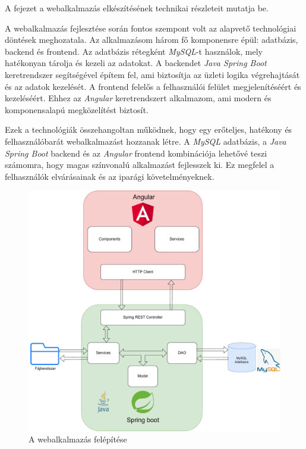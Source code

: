 
A fejezet a webalkalmazás elkészítésének technikai részleteit mutatja be.



A webalkalmazás fejlesztése során fontos szempont volt az alapvető technológiai döntések meghozatala. Az alkalmazásom három fő komponensre épül: adatbázis, backend és frontend. Az adatbázis rétegként \textit{MySQL}-t \cite{MySQL} használok, mely hatékonyan tárolja és kezeli az adatokat. A backendet \textit{Java Spring Boot} \cite{spring_boot} keretrendszer segítségével építem fel, ami biztosítja az üzleti logika végrehajtását és az adatok kezelését. A frontend felelős a felhasználói felület megjelenítéséért és kezeléséért. Ehhez az \textit{Angular} \cite{angular} keretrendszert alkalmazom, ami modern és komponensalapú megközelítést biztosít.

Ezek a technológiák összehangoltan működnek, hogy egy erőteljes, hatékony és felhasználóbarát webalkalmazást hozzanak létre. A \textit{MySQL} \cite{MySQL} adatbázis, a \textit{Java Spring Boot} \cite{spring_boot} backend és az \textit{Angular} \cite{angular} frontend kombinációja lehetővé teszi számomra, hogy magas színvonalú alkalmazást fejlesszek ki. Ez megfelel a felhasználók elvárásainak és az iparági követelményeknek.

\newpage

\begin{figure}[h]
\centering
\includegraphics[width=\textwidth]{images/A_webalkalmazás_felépítése.pdf}
\caption{A webalkalmazás felépítése}
\label{fig:felepites}
\end{figure}

